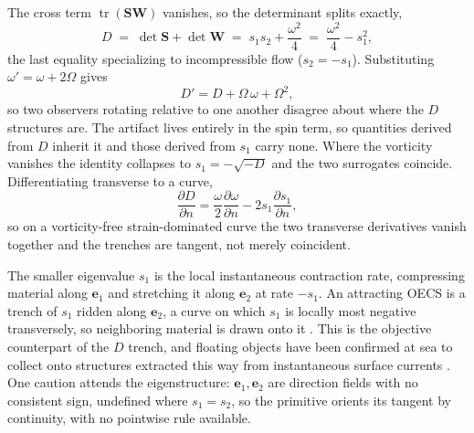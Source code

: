 \documentclass[lettersize,journal]{IEEEtran}
\begin{document}
The cross term $\operatorname{tr}(\mathbf{S}\mathbf{W})$ vanishes, so
the determinant splits exactly,
\begin{equation}
    D \;=\; \det\mathbf{S} + \det\mathbf{W}
      \;=\; s_1 s_2 + \frac{\omega^2}{4}
      \;=\; \frac{\omega^2}{4} - s_1^2,
    \label{eq:splitting}
\end{equation}
the last equality specializing to incompressible flow ($s_2 = -s_1$).
Substituting $\omega' = \omega + 2\Omega$ gives
\begin{equation}
    D' = D + \Omega\,\omega + \Omega^2,
    \label{eq:D_not_objective}
\end{equation}
so two observers rotating relative to one another disagree about where
the $D$ structures are. The artifact lives entirely in the spin term,
so quantities derived from $D$ inherit it and those
derived from $s_1$ carry none. Where the vorticity vanishes the
identity collapses to $s_1 = -\sqrt{-D}$ and the two surrogates
coincide. Differentiating transverse to a curve,
\begin{equation}
    \frac{\partial D}{\partial n} =
    \frac{\omega}{2}\frac{\partial \omega}{\partial n}
    - 2 s_1 \frac{\partial s_1}{\partial n},
    \label{eq:trench_coincide}
\end{equation}
so on a vorticity-free strain-dominated curve the two transverse
derivatives vanish together and the trenches are tangent, not merely
coincident.

The smaller eigenvalue $s_1$ is the local instantaneous contraction
rate, compressing material along $\mathbf{e}_1$ and stretching it along
$\mathbf{e}_2$ at rate $-s_1$. An attracting OECS is a trench of $s_1$
ridden along $\mathbf{e}_2$, a curve on which $s_1$ is locally most
negative transversely, so neighboring material is drawn onto it
\cite{17}. This is the objective counterpart of the $D$ trench, and
floating objects have been confirmed at sea to collect onto structures
extracted this way from instantaneous surface currents \cite{12}. One
caution attends the eigenstructure: $\mathbf{e}_1,
\mathbf{e}_2$ are direction fields with no consistent sign, undefined
where $s_1 = s_2$, so the primitive orients its tangent by continuity,
with no pointwise rule available.
\end{document}
